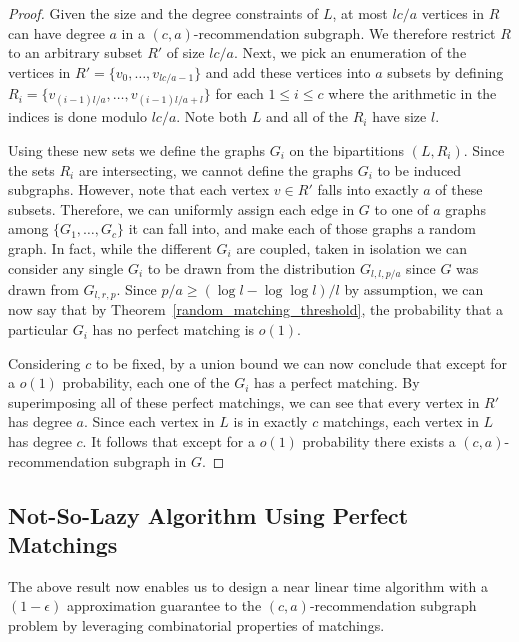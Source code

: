 \begin{proof}
Given the size and the degree constraints of $L$, at most $lc/a$
vertices in $R$ can have degree $a$ in a $(c,a)$-recommendation subgraph. We
therefore restrict $R$ to an arbitrary subset $R'$ of size $lc/a$.
Next, we pick an enumeration of the vertices in $R'=\{v_0,\ldots, v_{lc/a-1}\}$
and add these vertices into $a$ subsets by defining
$R_i = \{v_{(i-1)l/a}, \ldots, v_{(i-1)l/a+l}\}$ for each $1\leq i\leq c$ where
the arithmetic in the indices is done modulo $lc/a$. Note both $L$ and all of
the $R_i$ have size $l$. \vs

Using these new sets we define the graphs $G_i$ on the bipartitions
$(L, R_i)$. Since the sets $R_i$ are intersecting, we cannot define the
graphs $G_i$ to be induced subgraphs. However, note that each vertex $v\in R'$
falls into exactly $a$ of these subsets. Therefore, we can uniformly assign each
edge in $G$ to one of $a$ graphs among $\{G_1,\ldots, G_c\}$ it can fall into,
and make each of those graphs a random graph. In fact, while the different
$G_i$ are coupled, taken in isolation we can consider any single $G_i$ to be
drawn from the distribution $G_{l,l,p/a}$ since $G$ was drawn from $G_{l,r,p}$.
Since $p/a \geq (\log l - \log\log l)/l$ by assumption, we can now say that by
Theorem~\ref{random_matching_threshold}, the probability that a particular
$G_i$ has no perfect matching is $o(1)$. \vs

Considering $c$ to be fixed, by a union bound we can now conclude that except
for a $o(1)$ probability, each one of the $G_i$ has a perfect matching. By
superimposing all of these perfect matchings, we can see that every vertex in
$R'$ has degree $a$. Since each vertex in $L$ is in exactly $c$ matchings, each
vertex in $L$ has degree $c$. It follows that except for a $o(1)$ probability
 there exists a $(c,a)$-recommendation subgraph in $G$.
\end{proof}

\subsection{Not-So-Lazy Algorithm Using Perfect Matchings}

The above result now enables us to design a near linear time
algorithm with a $(1-\epsilon)$ approximation guarantee
to the $(c,a)$-recommendation subgraph problem by leveraging
combinatorial properties of matchings.

